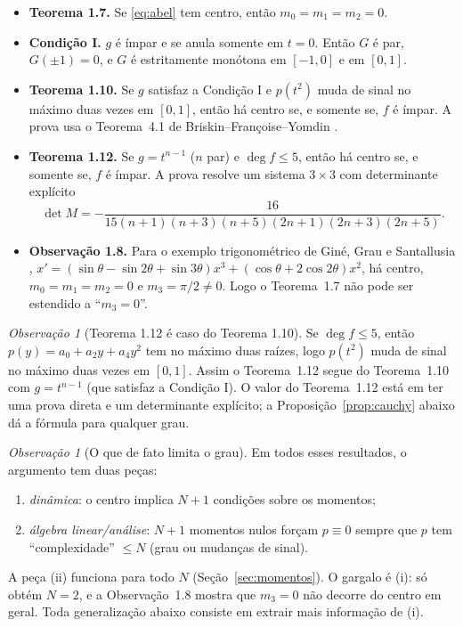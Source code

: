 \documentclass[11pt]{article}
\theoremstyle{plain}
\theoremstyle{definition}
\theoremstyle{remark}
\newtheorem{remark}[theorem]{Observação}
\begin{document}
\begin{itemize}[leftmargin=2em]
\item \textbf{Teorema 1.7.} Se \eqref{eq:abel} tem centro, então
 $m_0=m_1=m_2=0$.
\item \textbf{Condição I.} $g$ é ímpar e se anula somente em $t=0$.
 Então $G$ é par, $G(\pm1)=0$, e $G$ é estritamente monótona em $[-1,0]$ e
 em $[0,1]$.
\item \textbf{Teorema 1.10.} Se $g$ satisfaz a Condição I e $p(t^2)$ muda de sinal no
 máximo duas vezes em $[0,1]$, então há centro se, e somente se, $f$ é ímpar.
 A prova usa o Teorema~4.1 de Briskin--Françoise--Yomdin \cite{BFY00a}.
\item \textbf{Teorema 1.12.} Se $g=t^{n-1}$ ($n$ par) e $\deg f\le 5$, então há
 centro se, e somente se, $f$ é ímpar. A prova resolve um sistema $3\times3$
 com determinante explícito
 \[
 \det M=-\frac{16}{15(n+1)(n+3)(n+5)(2n+1)(2n+3)(2n+5)}.
 \]
\item \textbf{Observação 1.8.} Para o exemplo trigonométrico de Giné, Grau e
 Santallusia \cite{GGS14},
 $x'=(\sin\theta-\sin2\theta+\sin3\theta)x^3+(\cos\theta+2\cos2\theta)x^2$,
 há centro, $m_0=m_1=m_2=0$ e $m_3=\pi/2\neq 0$. Logo o Teorema~1.7 não pode
 ser estendido a ``$m_3=0$''.
\end{itemize}

\begin{remark}[Teorema 1.12 é caso do Teorema 1.10]\label{rem:112}
Se $\deg f\le5$, então $p(y)=a_0+a_2y+a_4y^2$ tem no máximo duas raízes, logo
$p(t^2)$ muda de sinal no máximo duas vezes em $[0,1]$. Assim o Teorema~1.12
segue do Teorema~1.10 com $g=t^{n-1}$ (que satisfaz a Condição I). O valor do
Teorema~1.12 está em ter uma prova direta e um determinante explícito; a
Proposição~\ref{prop:cauchy} abaixo dá a fórmula para qualquer grau.
\end{remark}

\begin{remark}[O que de fato limita o grau]
Em todos esses resultados, o argumento tem duas peças:
\begin{enumerate}[label=(\roman*)]
\item \emph{dinâmica}: o centro implica $N+1$ condições sobre os momentos;
\item \emph{álgebra linear/análise}: $N+1$ momentos nulos forçam $p\equiv0$
 sempre que $p$ tem ``complexidade'' $\le N$ (grau ou mudanças de sinal).
\end{enumerate}
A peça (ii) funciona para todo $N$ (Seção~\ref{sec:momentos}). O gargalo é (i):
\cite{ALA20} só obtém $N=2$, e a Observação~1.8 mostra que $m_3=0$ não decorre
do centro em geral. Toda generalização abaixo consiste em extrair mais
informação de (i).
\end{remark}
\end{document}
